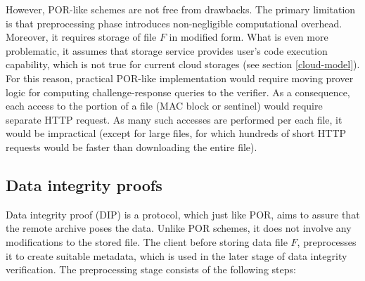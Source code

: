 However, POR-like schemes are not free from drawbacks. The primary limitation
is that preprocessing phase introduces non-negligible computational overhead.
Moreover, it requires storage of file $F$ in modified form. What is even more
problematic, it assumes that storage service provides user's code execution
capability, which is not true for current cloud storages 
(see section \ref{cloud-model}). For this reason, practical POR-like
implementation would require moving prover logic for computing 
challenge-response queries to the verifier. As a consequence, each access to
the portion of a file (MAC block or sentinel) would require separate HTTP
request. As many such accesses are performed per each file, it would be
impractical (except for large files, for which hundreds of short HTTP requests
would be faster than downloading the entire file).

		\subsection{Data integrity proofs}
Data integrity proof (DIP) \cite{dip} is a protocol, which just like POR, aims
to assure that the remote archive poses the data. Unlike POR schemes, it does
not involve any modifications to the stored file. The client before storing
data file $F$, preprocesses it to create suitable metadata, which is used in
the later stage of data integrity verification. The preprocessing stage
consists of the following steps:

